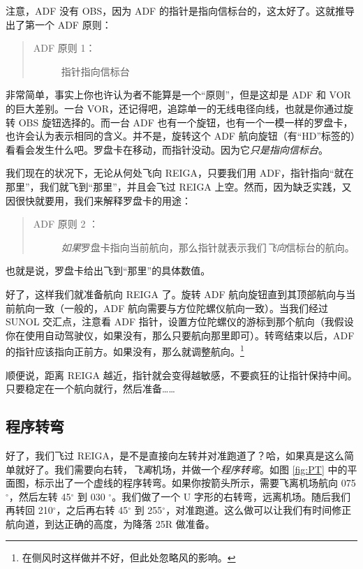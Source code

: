 注意，ADF 没有 OBS，因为 ADF 的指针是指向信标台的，这太好了。这就推导出了第一个 ADF 原则：

\begin{quote}
  \begin{description}
  \item[ADF 原则 1：] 指针指向信标台
  \end{description}
\end{quote}

非常简单，事实上你也许认为者不能算是一个“原则”，但是这却是 ADF 和 VOR 的巨大差别。一台 VOR，还记得吧，追踪单一的无线电径向线，也就是你通过旋转 OBS 旋钮选择的。而一台 ADF 也有一个旋钮，也有一个一模一样的罗盘卡，也许会认为表示相同的含义。并不是，旋转这个 ADF 航向旋钮（有“HD”标签的）看看会发生什么吧。罗盘卡在移动，而指针没动。因为它\emph{只是指向信标台}。

我们现在的状况下，无论从何处飞向 REIGA，只要我们用 ADF，指针指向“就在那里”，我们就飞到“那里”，并且会飞过 REIGA 上空。然而，因为缺乏实践，又因很快就要用，我们来解释罗盘卡的用途：

\begin{quote}
  \begin{description}
  \item[ADF 原则 2 ：] \emph{如果}罗盘卡指向当前航向，那么指针就表示我们\emph{飞向}信标台的航向。
  \end{description}
\end{quote}

也就是说，罗盘卡给出飞到“那里”的具体数值。

好了，这样我们就准备航向 REIGA 了。旋转 ADF 航向旋钮直到其顶部航向与当前航向一致（一般的，ADF 航向需要与方位陀螺仪航向一致）。当我们经过 SUNOL 交汇点，注意看 ADF 指针，设置方位陀螺仪的游标到那个航向（我假设你在使用自动驾驶仪，如果没有，那么只要航向那里即可）。转弯结束以后，ADF 的指针应该指向正前方。如果没有，那么就调整航向。\footnote{在侧风时这样做并不好，但此处忽略风的影响。}

顺便说，距离 REIGA 越近，指针就会变得越敏感，不要疯狂的让指针保持中间。只要稳定在一个航向就行，然后准备……

\subsection{程序转弯}

好了，我们飞过 REIGA，是不是直接向左转并对准跑道了？哈，如果真是这么简单就好了。我们需要向右转，\emph{飞离}机场，并做一个\emph{程序转弯}。如图 \ref{fig:PT} 中的平面图，标示出了一个虚线的程序转弯。如果你按箭头所示，需要飞离机场航向 075$^\circ$，然后左转 45$^\circ$ 到 030 $^\circ$。我们做了一个 U 字形的右转弯，远离机场。随后我们再转回 210$^\circ$，之后再右转 45$^\circ$ 到 255$^\circ$，对准跑道。这么做可以让我们有时间修正航向道，到达正确的高度，为降落 25R 做准备。

